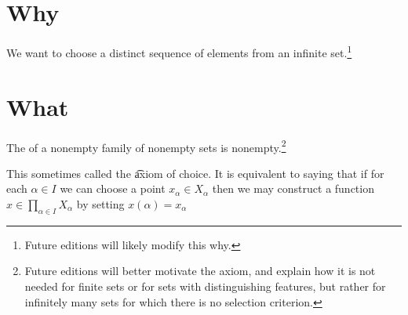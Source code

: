 
\section*{Why}

We want to choose a distinct sequence of elements from an infinite set.\footnote{Future editions will likely modify this why.}

\section*{What}

\begin{principle}[Choice]
The of a nonempty family of nonempty sets is nonempty.\footnote{Future editions will better motivate the axiom, and explain how it is not needed for finite sets or for sets with distinguishing features, but rather for infinitely many sets for which there is no selection criterion.}
\end{principle}

This sometimes called the \t{axiom of choice}.
It is equivalent to saying that if for each $\alpha  \in I$ we can choose a point $x_{\alpha } \in X_{\alpha }$ then we may construct a function $x \in \prod_{\alpha  \in I}X_{\alpha }$ by setting $x(\alpha ) = x_{\alpha }$

\blankpage